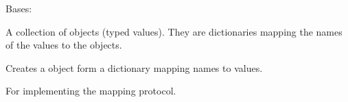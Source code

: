 \documentclass[letterpaper,10pt,english]{sphinxmanual}
\begin{document}

\begin{fulllineitems}
\label{\detokenize{api:nanostream.utils.data_structures.Row}}
Bases: 

A collection of  objects (typed values). They are dictionaries
mapping the names of the values to the  objects.

\begin{fulllineitems}
\label{\detokenize{api:nanostream.utils.data_structures.Row.concat}}
\end{fulllineitems}


\begin{fulllineitems}
\label{\detokenize{api:nanostream.utils.data_structures.Row.from_dict}}
Creates a  object form a dictionary mapping names to values.

\end{fulllineitems}


\begin{fulllineitems}
\label{\detokenize{api:nanostream.utils.data_structures.Row.is_empty}}
\end{fulllineitems}


\begin{fulllineitems}
\label{\detokenize{api:nanostream.utils.data_structures.Row.keys}}
For implementing the mapping protocol.

\end{fulllineitems}


\end{fulllineitems}
\end{document}
